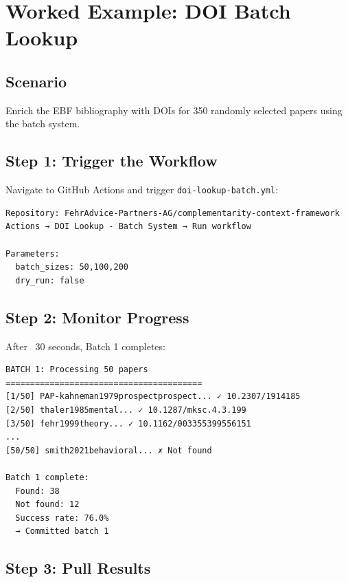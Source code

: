 \section{Worked Example: DOI Batch Lookup}
\label{sec:api-worked-example}

\subsection{Scenario}

Enrich the EBF bibliography with DOIs for 350 randomly selected papers using the batch system.

\subsection{Step 1: Trigger the Workflow}

Navigate to GitHub Actions and trigger \texttt{doi-lookup-batch.yml}:

\begin{verbatim}
Repository: FehrAdvice-Partners-AG/complementarity-context-framework
Actions → DOI Lookup - Batch System → Run workflow

Parameters:
  batch_sizes: 50,100,200
  dry_run: false
\end{verbatim}

\subsection{Step 2: Monitor Progress}

After ~30 seconds, Batch 1 completes:

\begin{verbatim}
BATCH 1: Processing 50 papers
========================================
[1/50] PAP-kahneman1979prospectprospect... ✓ 10.2307/1914185
[2/50] thaler1985mental... ✓ 10.1287/mksc.4.3.199
[3/50] fehr1999theory... ✓ 10.1162/003355399556151
...
[50/50] smith2021behavioral... ✗ Not found

Batch 1 complete:
  Found: 38
  Not found: 12
  Success rate: 76.0%
  → Committed batch 1
\end{verbatim}

\subsection{Step 3: Pull Results}

